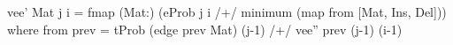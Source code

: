 vee' Mat j i = fmap (Mat:)
  (eProb j i /+/ minimum (map from [Mat, Ins, Del]))
 where from prev = tProb (edge prev Mat) (j-1) /+/
                               vee'' prev (j-1) (i-1)

